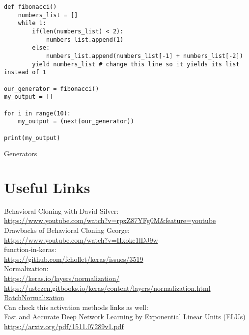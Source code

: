 \documentclass[11pt, a4paper]{article}
\begin{document}
\begin{listing}
\begin{verbatim}
def fibonacci()
    numbers_list = []
    while 1:
        if(len(numbers_list) < 2):
            numbers_list.append(1)
        else:
            numbers_list.append(numbers_list[-1] + numbers_list[-2])
        yield numbers_list # change this line so it yields its list instead of 1

our_generator = fibonacci()
my_output = []

for i in range(10):
    my_output = (next(our_generator))

print(my_output)
\end{verbatim}
\caption{Generators}
\label{lst:generators}
\end{listing}





\section{Useful Links}%
\label{sec:useful_links}




Behavioral Cloning with David Silver: \\
\url{https://www.youtube.com/watch?v=rpxZ87YFg0M&feature=youtube} \\

Drawbacks of Behavioral Cloning George: \\
\url{https://www.youtube.com/watch?v=Hxoke1lDJ9w} \\

function-in-keras: \\
\url{https://github.com/fchollet/keras/issues/3519} \\


Normalization: \\
\url{https://keras.io/layers/normalization/} \\
\url{https://ustczen.gitbooks.io/keras/content/layers/normalization.html} \\

\href{http://stackoverflow.com/questions/34716454/where-do-i-call-the-batchnormalization-function-in-keras}{BatchNormalization} \\


Can check this activation methods links as well: \\

Fast and Accurate Deep Network Learning by Exponential Linear Units (ELUs)\\
\url{https://arxiv.org/pdf/1511.07289v1.pdf} \\
\end{document}
